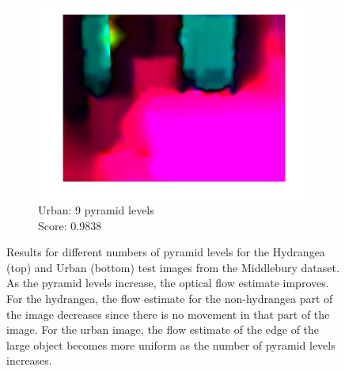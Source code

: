 \documentclass[10pt,twocolumn,letterpaper]{article}
\begin{document}
\begin{figure}[t]
\begin{subfigure}[b]{0.3\textwidth}
    \end{subfigure} \hfill
    \begin{subfigure}[b]{0.3\textwidth}
    	\centering
        \includegraphics[width=\textwidth] {urban2_9levels.jpg}
        \caption{Urban: 9 pyramid levels \\ Score: 0.9838}
        \label{fig:urban9}
    \end{subfigure}
	\caption{Results for different numbers of pyramid levels for the Hydrangea (top) and Urban (bottom) test images from the Middlebury dataset. As the pyramid levels increase, the optical flow estimate improves. For the hydrangea, the flow estimate for the non-hydrangea part of the image decreases since there is no movement in that part of the image. For the urban image, the flow estimate of the edge of the large object becomes more uniform as the number of pyramid levels increases. }
	\label{fig:multires}
\end{figure}
\end{document}
